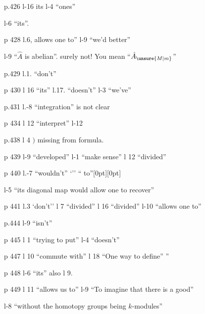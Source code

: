 
p.426 l-16 its \quad l-4 ``ones''

 l-6 ``its''.

p 428 l.6, allows one to'' \quad l-9 ``we'd better''

l-9 ``$\hat{A}$ is abelian''. surely not! You mean ``$\hat{A}_{\unsure{M|m}}$''

p.429 l.1. ``don't''

p 430 l 16 ``its'' \quad l.17. ``doesn't'' \quad l-3 ``we've''

p.431 l.-8 ``integration'' is not clear

p 434 l 12 ``interpret'' \quad l-12 

p.438 l 4 \mbox{$)$} missing from formula.

p 439 l-9 ``developed'' \quad l-1 ``make sense'' \quad l 12 ``divided''

p 440 l.-7 ``wouldn't'' \quad {} `'' \quad `` to''\raisebox{1.1ex}[0pt][0pt]{\unsure{-+|+}}

l-5 ``its diagonal map would allow one to recover''

p 441 l.3 `don't'' \quad l 7 ``divided'' \quad l 16 ``divided'' \quad l-10 ``allows one to''

p.444 l-9 ``isn't''

p 445 l 1 ``trying to put'' \quad l-4 ``doesn't''

p 447 l 10 ``commute with'' \quad l 18 ``One way to define'' \quad {} ''

p 448 l-6 ``its'' also l 9.

p 449 l 11 ``allows  us to'' \quad l-9 ``To imagine that there is a good''

l-8 ``without the homotopy groups being $k$-modules''

